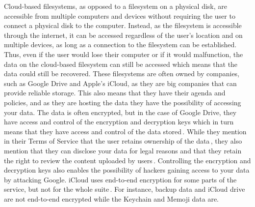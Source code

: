 Cloud-based filesystems, as opposed to a filesystem on a physical disk, are accessible from multiple computers and devices without requiring the user to connect a physical disk to the computer. Instead, as the filesystem is accessible through the internet, it can be accessed regardless of the user's location and on multiple devices, as long as a connection to the filesystem can be established. Thus, even if the user would lose their computer or if it would malfunction, the data on the \mbox{cloud-based} filesystem can still be accessed which means that the data could still be recovered. These filesystems are often owned by companies, such as Google Drive and Apple's iCloud, as they are big companies that can provide reliable storage. This also means that they have their agenda and policies, and as they are hosting the data they have the possibility of accessing your data. The data is often encrypted, but in the case of Google Drive, they have access and control of the encryption and decryption keys which in turn means that they have access and control of the data stored\,\cite{johnsonGoogleDriveSecure2021}. While they mention in their Terms of Service that the user retains ownership of the data\,\cite{googleGoogleDriveTerms}, they also mention that they can disclose your data for legal reasons and that they retain the right to review the content uploaded by users\,\cite{googleGoogleTermsService}. Controlling the encryption and decryption keys also enables the possibility of hackers gaining access to your data by attacking Google. iCloud uses \mbox{end-to-end} encryption for some parts of the service, but not for the whole suite\,\cite{appleinc.ICloudSecurityOverview}. For instance, backup data and iCloud drive are not \mbox{end-to-end} encrypted while the Keychain and Memoji data are.

